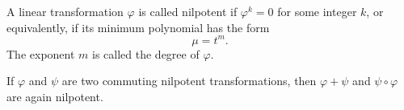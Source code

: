 A linear transformation $\varphi$ is called nilpotent if $\varphi^k = 0$ for some integer $k$, or equivalently, if its minimum polynomial has the form
$$\mu = t^m.$$
The exponent $m$ is called the degree of $\varphi$.

If $\varphi$ and $\psi$ are two commuting nilpotent transformations, then $\varphi + \psi$ and $\psi \circ \varphi$ are again nilpotent.
